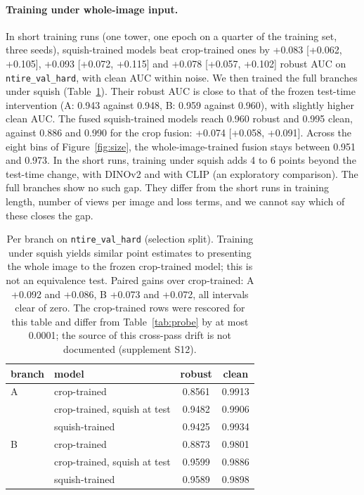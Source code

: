 \documentclass[letterpaper]{article} %
\begin{document}
\paragraph{Training under whole-image input.} In short training runs (one tower,
one epoch on a quarter of the training set, three seeds), squish-trained
models beat crop-trained ones by +0.083 [+0.062, +0.105], +0.093 [+0.072,
+0.115] and +0.078 [+0.057, +0.102] robust AUC on \texttt{ntire\_val\_hard},
with clean AUC within noise. We then trained the full branches under squish
(Table~\ref{tab:branches}). Their robust AUC is close to that of the frozen test-time intervention (A:
0.943 against 0.948, B: 0.959 against 0.960), with slightly higher clean AUC. The
fused squish-trained models reach 0.960 robust and 0.995 clean, against 0.886
and 0.990 for the crop fusion: +0.074 [+0.058, +0.091]. Across the eight bins of Figure~\ref{fig:size}, the whole-image-trained fusion stays between 0.951 and 0.973. In the short runs, training under squish adds 4 to 6
points beyond the test-time change, with DINOv2 and with CLIP (an
exploratory comparison). The full branches show no such gap. They
differ from the short runs in training length, number of views per image and
loss terms, and we cannot say which of these closes the gap.

\begin{table}[t]
\centering
\small
\setlength{\tabcolsep}{4pt}
\begin{tabular}{llcc}
\toprule
branch & model & robust & clean \\
\midrule
A & crop-trained & 0.8561 & 0.9913 \\
  & crop-trained, squish at test & 0.9482 & 0.9906 \\
  & squish-trained & 0.9425 & 0.9934 \\
\midrule
B & crop-trained & 0.8873 & 0.9801 \\
  & crop-trained, squish at test & 0.9599 & 0.9886 \\
  & squish-trained & 0.9589 & 0.9898 \\
\bottomrule
\end{tabular}
\caption{Per branch on \texttt{ntire\_val\_hard} (selection split). Training under
squish yields similar point estimates to presenting the whole image to
the frozen crop-trained model; this is not an equivalence test. Paired gains over crop-trained: A +0.092 and +0.086, B
+0.073 and +0.072, all intervals clear of zero. The crop-trained rows were
rescored for this table and differ from Table~\ref{tab:probe} by at most 0.0001; the source of this cross-pass drift is not documented (supplement S12).}
\label{tab:branches}
\end{table}
\end{document}
